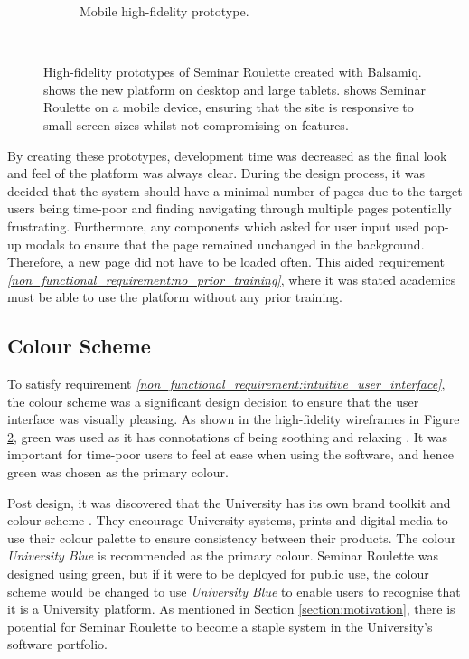 \documentclass{l4proj}
\begin{document}
\begin{figure}[htb]
\begin{subfigure}[b]{0.3\textwidth}
        \caption{Mobile high-fidelity prototype.}
        \label{fig:mobile_prototype}
    \end{subfigure}
    ~
    \caption{High-fidelity prototypes of Seminar Roulette created with Balsamiq.  shows the new platform on desktop and large tablets.  shows Seminar Roulette on a mobile device, ensuring that the site is responsive to small screen sizes whilst not compromising on features.}
    \label{fig:initial_prototypes}
\end{figure}

By creating these prototypes, development time was decreased as the final look and feel of the platform was always clear. During the design process, it was decided that the system should have a minimal number of pages due to the target users being time-poor and finding navigating through multiple pages potentially frustrating. Furthermore, any components which asked for user input used pop-up modals to ensure that the page remained unchanged in the background. Therefore, a new page did not have to be loaded often. This aided requirement \emph{\ref{non_functional_requirement:no_prior_training}}, where it was stated academics must be able to use the platform without any prior training.

\subsection{Colour Scheme}

To satisfy requirement \emph{\ref{non_functional_requirement:intuitive_user_interface}}, the colour scheme was a significant design decision to ensure that the user interface was visually pleasing. As shown in the high-fidelity wireframes in Figure \ref{fig:initial_prototypes}, green was used as it has connotations of being soothing and relaxing \citep{greenmeaning}. It was important for time-poor users to feel at ease when using the software, and hence green was chosen as the primary colour.

Post design, it was discovered that the University has its own brand toolkit and colour scheme \citep{uofgbrandtoolkit}. They encourage University systems, prints and digital media to use their colour palette to ensure consistency between their products. The colour \emph{University Blue} is recommended as the primary colour. Seminar Roulette was designed using green, but if it were to be deployed for public use, the colour scheme would be changed to use \emph{University Blue} to enable users to recognise that it is a University platform. As mentioned in Section \ref{section:motivation}, there is potential for Seminar Roulette to become a staple system in the University's software portfolio.
\end{document}
